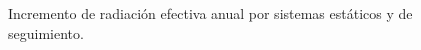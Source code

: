 \begin{figure}
  \begin{centering}
    \par\end{centering}
  
  \caption[Comparativa entre radiación efectiva]{Incremento de
    radiación efectiva anual por sistemas estáticos y de
    seguimiento.}
  \label{fig:ComparativaRadiación}
\end{figure}

